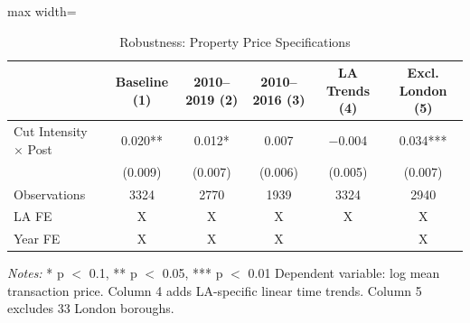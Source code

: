 \begin{table}
\centering
\caption{Robustness: Property Price Specifications}
\centering
\begin{adjustbox}{max width=\textwidth}
\begin{tabular}[t]{lccccc}
\toprule
  & Baseline
(1) & 2010--2019
(2) & 2010--2016
(3) & LA Trends
(4) & Excl. London
(5)\\
\midrule
Cut Intensity $\times$ Post & \num{0.020}** & \num{0.012}* & \num{0.007} & \num{-0.004} & \num{0.034}***\\
 & (\num{0.009}) & (\num{0.007}) & (\num{0.006}) & (\num{0.005}) & (\num{0.007})\\
\midrule
Observations & \num{3324} & \num{2770} & \num{1939} & \num{3324} & \num{2940}\\
LA FE & X & X & X & X & X\\
Year FE & X & X & X &  & X\\
\bottomrule

\end{tabular}
\end{adjustbox}
\begin{flushleft}
\footnotesize
\textit{Notes:} * p $<$ 0.1, ** p $<$ 0.05, *** p $<$ 0.01 Dependent variable: log mean transaction price. Column 4 adds LA-specific linear time trends. Column 5 excludes 33 London boroughs.
\end{flushleft}
\end{table}
